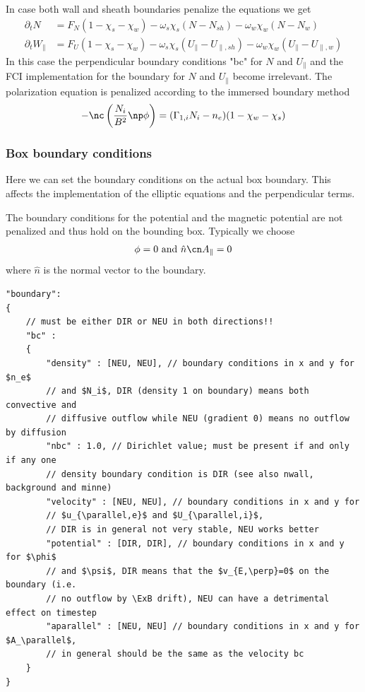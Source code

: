 \begin{tcolorbox}[title=Note]
    In case both wall and sheath boundaries penalize the equations we get
    \begin{subequations} \label{eq:sheath_wall_equations}
    \begin{align}
        \partial_t N &= F_N ( 1-\chi_s - \chi_w)  -\omega_s\chi_s (N-N_{sh}) -\omega_w\chi_w (N-N_{w})\\
        \partial_t W_\parallel &= F_U  ( 1 - \chi_s- \chi_w) -\omega_s \chi_s (U_\parallel - U_{\parallel,sh})-\omega_w\chi_w (U_\parallel- U_{\parallel,w})
    \end{align}
    \end{subequations}
    In this case the perpendicular boundary
    conditions "bc" for $N$ and $U_\parallel$ and the FCI implementation for the
    boundary for $N$ and $U_\parallel$ become irrelevant.
The polarization equation is penalized according to the immersed boundary method
\begin{align}
    -\nc\left( \frac{N_i}{B^2}\np \phi \right) = (\Gamma_{1,i} N_i - n_e)(1-\chi_w -\chi_s)
\end{align}
\end{tcolorbox}

\subsubsection{Box boundary conditions}
Here we can set the boundary conditions on the actual box boundary.
This affects the implementation of the elliptic equations and the
perpendicular terms.

The boundary conditions for the potential and the magnetic potential are not
penalized and thus hold on the bounding box. Typically we choose
\begin{align}
\phi = 0
\text{ and }  \hat n \cn A_{\parallel} = 0
\end{align}
where $\hat n$ is the normal vector to the boundary.

\begin{verbatim}
"boundary":
{
    // must be either DIR or NEU in both directions!!
    "bc" :
    {
        "density" : [NEU, NEU], // boundary conditions in x and y for $n_e$
        // and $N_i$, DIR (density 1 on boundary) means both convective and
        // diffusive outflow while NEU (gradient 0) means no outflow by diffusion
        "nbc" : 1.0, // Dirichlet value; must be present if and only if any one
        // density boundary condition is DIR (see also nwall, background and minne)
        "velocity" : [NEU, NEU], // boundary conditions in x and y for
        // $u_{\parallel,e}$ and $U_{\parallel,i}$,
        // DIR is in general not very stable, NEU works better
        "potential" : [DIR, DIR], // boundary conditions in x and y for $\phi$
        // and $\psi$, DIR means that the $v_{E,\perp}=0$ on the boundary (i.e.
        // no outflow by \ExB drift), NEU can have a detrimental effect on timestep
        "aparallel" : [NEU, NEU] // boundary conditions in x and y for $A_\parallel$,
        // in general should be the same as the velocity bc
    }
}
\end{verbatim}

